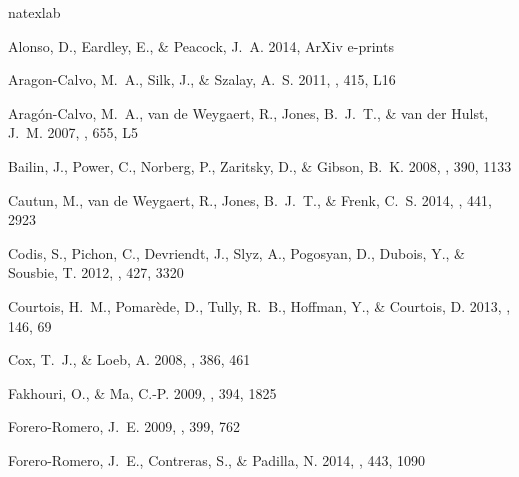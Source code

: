 \documentclass{emulateapj}
\begin{document}
\begin{thebibliography}{48}
\expandafter\ifx\csname natexlab\endcsname\relax\def\natexlab#1{#1}\fi

{Alonso}, D., {Eardley}, E., \& {Peacock}, J.~A. 2014, ArXiv e-prints

{Aragon-Calvo}, M.~A., {Silk}, J., \& {Szalay}, A.~S. 2011, \mnras, 415, L16

{Arag{\'o}n-Calvo}, M.~A., {van de Weygaert}, R., {Jones}, B.~J.~T., \& {van
  der Hulst}, J.~M. 2007, \apjl, 655, L5

{Bailin}, J., {Power}, C., {Norberg}, P., {Zaritsky}, D., \& {Gibson}, B.~K.
  2008, \mnras, 390, 1133

{Cautun}, M., {van de Weygaert}, R., {Jones}, B.~J.~T., \& {Frenk}, C.~S. 2014,
  \mnras, 441, 2923

{Codis}, S., {Pichon}, C., {Devriendt}, J., {Slyz}, A., {Pogosyan}, D.,
  {Dubois}, Y., \& {Sousbie}, T. 2012, \mnras, 427, 3320

{Courtois}, H.~M., {Pomar{\`e}de}, D., {Tully}, R.~B., {Hoffman}, Y., \&
  {Courtois}, D. 2013, \aj, 146, 69

{Cox}, T.~J., \& {Loeb}, A. 2008, \mnras, 386, 461

{Fakhouri}, O., \& {Ma}, C.-P. 2009, \mnras, 394, 1825

{Forero-Romero}, J.~E. 2009, \mnras, 399, 762

{Forero-Romero}, J.~E., {Contreras}, S., \& {Padilla}, N. 2014, \mnras, 443,
  1090


\end{thebibliography}
\end{document}

